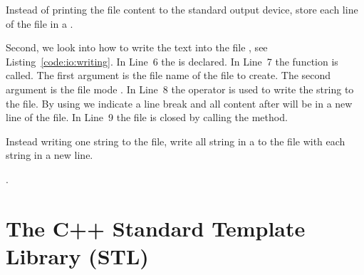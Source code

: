 

\begin{exercise}
Instead of printing the file content to the standard output device, store each line of the file in a .
\end{exercise}
\vspace{0.25cm}

Second, we look into how to write the text  into the file , see Listing~\ref{code:io:writing}. In Line~6 the  is declared. In Line~7 the function  is called. The first argument is the file name of the file to create. The second argument is the file mode . In Line~8 the operator \cpp{<<} is used to write the string to the file. By using  we indicate a line break and all content after will be in a new line of the file. In Line~9 the file is closed by calling the  method.

\begin{exercise}
Instead writing one string to the file, write all string in a  to the file with each string in a new line.
\end{exercise}

. 


\newpage
\theendnotes

\chapter{The C++ Standard Template Library (STL)}
\label{chapter:stl}

